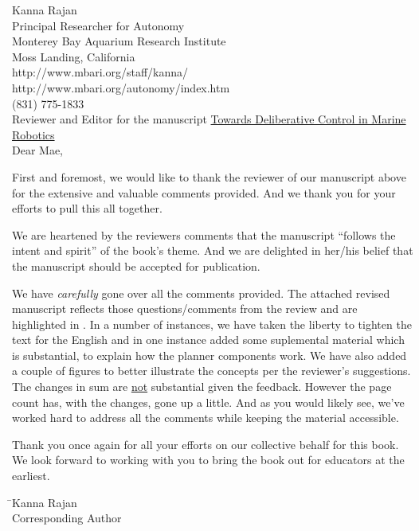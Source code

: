 \documentclass[11pt,twoside]{article}
\begin{document}
\thispagestyle{empty}
\pagestyle{empty}
\setlength{\parindent}{0pt} 
\setlength{\parskip}{2ex}


\small{Kanna Rajan}\\
\small{Principal Researcher for Autonomy}\\
\small{Monterey Bay Aquarium Research Institute}\\
\small{Moss Landing, California}\\
\small{http://www.mbari.org/staff/kanna/}\\
\small{http://www.mbari.org/autonomy/index.htm}\\
\small{(831) 775-1833}\\

Reviewer and Editor for the manuscript \textsf{\underline{Towards Deliberative Control in Marine Robotics}}\\

Dear Mae,

First and foremost, we would like to thank the reviewer of our
manuscript above for the extensive and valuable comments provided. And
we thank you for your efforts to pull this all together.

We are heartened by the reviewers comments that the manuscript
``follows the intent and spirit'' of the book's theme. And we are
delighted in her/his belief that the manuscript should be accepted for
publication.

We have \emph{carefully} gone over all the comments provided. The
attached revised manuscript reflects those questions/comments from the
review and are highlighted in  . In a number of
instances, we have taken the liberty to tighten the text for the
English and in one instance added some suplemental material which is
substantial, to explain how the \eu planner components work. We have
also added a couple of figures to better illustrate the concepts per
the reviewer's suggestions. The changes in sum are \underline{not}
substantial given the feedback. However the page count has, with the
changes, gone up a little. And as you would likely see, we've worked
hard to address all the comments while keeping the material
accessible.

Thank you once again for all your efforts on our collective behalf for
this book. We look forward to working with you to bring the book out
for educators at the earliest.

\vspace{+2cm}
\begin{tabbing}
\hspace{+10cm}\=\small{Kanna Rajan}\\
\>\small{Corresponding Author}\\
\end{tabbing}
\end{document}
